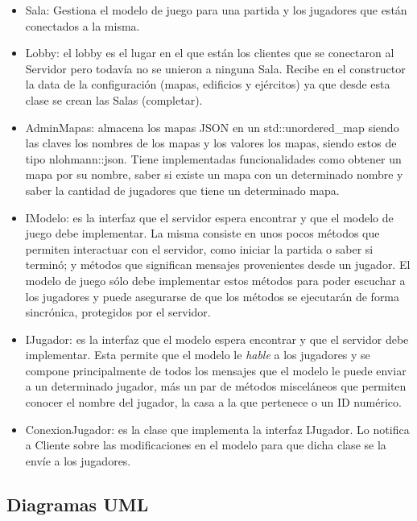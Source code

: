 \documentclass[titlepage,a4paper,12pt]{article}
\begin{document}
\begin{itemize}
\item Sala: Gestiona el modelo de juego para una partida y los jugadores que están conectados a la misma.

\item Lobby: el lobby es el lugar en el que están los clientes que se conectaron al Servidor pero todavía no se unieron a ninguna Sala. Recibe en el constructor la data de la configuración (mapas, edificios y ejércitos) ya que desde esta clase se crean las Salas (completar).

\item AdminMapas: almacena los mapas JSON en un std::unordered\_map siendo las claves los nombres de los mapas y los valores los mapas, siendo estos de tipo nlohmann::json. Tiene implementadas funcionalidades como obtener un mapa por su nombre, saber si existe un mapa con un determinado nombre y saber la cantidad de jugadores que tiene un determinado mapa.

\item IModelo: es la interfaz que el servidor espera encontrar y que el modelo de juego debe implementar. La misma consiste en unos pocos métodos que permiten interactuar con el servidor, como iniciar la partida o saber si terminó; y métodos que significan mensajes provenientes desde un jugador. El modelo de juego sólo debe implementar estos métodos para poder escuchar a los jugadores y puede asegurarse de que los métodos se ejecutarán de forma sincrónica, protegidos por el servidor.

\item IJugador: es la interfaz que el modelo espera encontrar y que el servidor debe implementar. Esta permite que el modelo le \textit{hable} a los jugadores y se compone principalmente de todos los mensajes que el modelo le puede enviar a un determinado jugador, más un par de métodos misceláneos que permiten conocer el nombre del jugador, la casa a la que pertenece o un ID numérico.

\item ConexionJugador: es la clase que implementa la interfaz IJugador. Lo notifica a Cliente sobre las modificaciones en el modelo para que dicha clase se la envíe a los jugadores.

\end{itemize}

\subsection{Diagramas UML}
\end{document}

